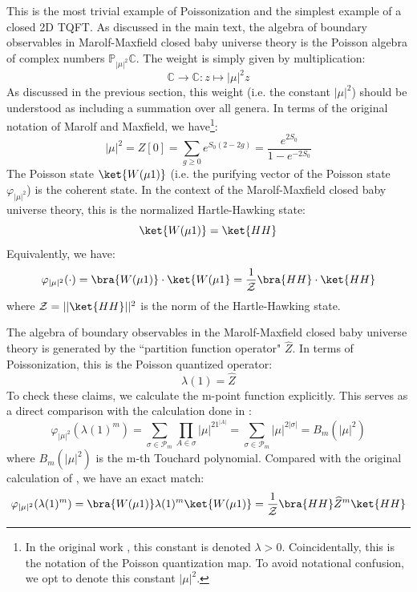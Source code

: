 \documentclass[a4paper,11pt]{article}
\theoremstyle{definition}
\numberwithin{equation}{section}
\begin{document}
This is the most trivial example of Poissonization and the simplest example of a closed 2D TQFT. As discussed in the main text, the algebra of boundary observables in Marolf-Maxfield closed baby universe theory is the Poisson algebra of complex numbers $\mathbb{P}_{|\mu|^2}\mathbb{C}$. The weight is simply given by multiplication:
\begin{equation}
    \mathbb{C}\rightarrow\mathbb{C}:z\mapsto|\mu|^2z
\end{equation}
As discussed in the previous section, this weight (i.e. the constant $|\mu|^2$) should be understood as including a summation over all genera. In terms of the original notation of Marolf and Maxfield, we have\footnote{In the original work \cite{MM}, this constant is denoted $\lambda > 0$. Coincidentally, this is the notation of the Poisson quantization map. To avoid notational confusion, we opt to denote this constant $|\mu|^2$.}:
\begin{equation}
    |\mu|^2 = Z[0] = \sum_{g\geq 0} e^{S_0(2-2g)} = \frac{e^{2S_0}}{1 - e^{-2S_0}}
\end{equation}
The Poisson state $\ket{W(\mu 1)}$ (i.e. the purifying vector of the Poisson state $\varphi_{|\mu|^2}$) is the coherent state. In the context of the Marolf-Maxfield closed baby universe theory, this is the normalized Hartle-Hawking state:
\begin{equation}
    \ket{W(\mu1)} = \ket{HH}
\end{equation}
Equivalently, we have:
\begin{equation}
    \varphi_{|\mu|^2}(\cdot) = \bra{W(\mu 1)}\cdot\ket{W(\mu 1} = \frac{1}{\mathcal{Z}}\bra{HH}\cdot\ket{HH}
\end{equation}
where $\mathcal{Z} = ||\ket{HH}||^2$ is the norm of the Hartle-Hawking state.

The algebra of boundary observables in the Marolf-Maxfield closed baby universe theory is generated by the ``partition function operator" $\widehat{Z}$. In terms of Poissonization, this is the Poisson quantized operator:
\begin{equation}
    \lambda(1) = \widehat{Z}
 \end{equation}
To check these claims, we calculate the m-point function explicitly. This serves as a direct comparison with the calculation done in \cite{MM}:
\begin{equation}
    \varphi_{|\mu|^2}(\lambda(1)^m) = \sum_{\sigma\in\mathcal{P}_m}\prod_{A\in\sigma}|\mu|^21^{|A|} = \sum_{\sigma\in\mathcal{P}_m}|\mu|^{2|\sigma|} = B_m(|\mu|^2)
\end{equation}
where $B_m(|\mu|^2)$ is the m-th Touchard polynomial. Compared with the original calculation of \cite{MM}, we have an exact match:
\begin{equation}
    \varphi_{|\mu|^2}(\lambda(1)^m) = \bra{W(\mu 1)}\lambda(1)^m\ket{W(\mu 1)} = \frac{1}{\mathcal{Z}}\bra{HH}\widehat{Z}^m\ket{HH}
\end{equation}
\end{document}
